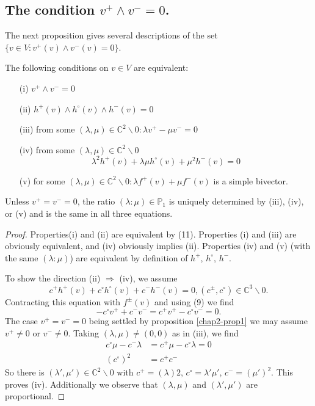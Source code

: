 \subsection{The condition \texorpdfstring{\boldmath$v^{+}\wedge v^{-}=0$}{v+}.}\label{chap2-sec2.4}

The next proposition gives several descriptions of the set $\{v\in
V:v^{+}(v)\wedge v^{-}(v)=0\}$.

\begin{proposition}\label{chap2-prop2}
The following conditions on $v\in V$ are equivalent:
\begin{itemize}
\item[\rm(i)] $v^{+}\wedge v^{-}=0$

\item[\rm(ii)] $h^{+}(v)\wedge h^{\circ}(v)\wedge h^{-}(v)=0$

\item[\rm(iii)] from some $(\lambda,\mu)\in \mathbb{C}^{2}\backslash
0:\lambda v^{+}-\mu v^{-}=0$

\item[\rm(iv)] from some $(\lambda,\mu)\in \mathbb{C}^{2}\backslash 0$
$$
\lambda^{2}h^{+}(v)+\lambda \mu h^{\circ}(v)+\mu^{2}h^{-}(v)=0
$$

\item[\rm(v)] for some $(\lambda,\mu)\in \mathbb{C}^{2}\backslash
0:\lambda f^{+}(v)+\mu f^{-}(v)$ is a simple bivector.
\end{itemize}
Unless $v^{+}=v^{-}=0$, the ratio $(\lambda:\mu)\in \mathbb{P}_{1}$ is
uniquely determined by {\rm (iii), (iv),} or {\rm (v)} and is the same
in all three equations.
\end{proposition}

\begin{proof}
Properties\pageoriginale (i) and (ii) are equivalent by (11). Properties (i) and
(iii) are obviously equivalent, and (iv) obviously implies
(ii). Properties (iv) and (v) (with the same $(\lambda:\mu)$) are
equivalent by definition of $h^{+}$, $h^{\circ}$, $h^{-}$.

To show the direction (ii) $\Rightarrow$ (iv), we assume
$$
c^{+}h^{+}(v)+c^{\circ}h^{\circ}(v)+c^{-}h^{-}(v)=0,
(c^{\pm},c^{\circ})\in \mathbb{C}^{3}\backslash 0.
$$
Contracting this equation with $f^{\pm}(v)$ and using (9) we find 
$$
-c^{\circ}v^{+}+c^{-}v^{-}=c^{+}v^{+}-c^{\circ}v^{-}=0.
$$
The case $v^{+}=v^{-}=0$ being settled by
proposition \ref{chap2-prop1} we may assume $v^{+}\neq 0$ or
$v^{-}\neq 0$. Taking $(\lambda,\mu)\neq (0,0)$ as in (iii), we find
\begin{align*}
c^{\circ}\mu-c^{-}\lambda &= c^{+}\mu-c^{\circ}\lambda=0\\[3pt]
(c^{\circ})^{2} &= c^{+}c^{-}
\end{align*}
So there is $(\lambda',\mu')\in \mathbb{C}^{2}\backslash 0$ with
$c^{+}=(\lambda)2$, $c^{\circ}=\lambda'\mu'$, $c^{-}=(\mu')^{2}$. This
proves (iv). Additionally we observe that $(\lambda,\mu)$ and
$(\lambda',\mu')$ are proportional.
\end{proof}

